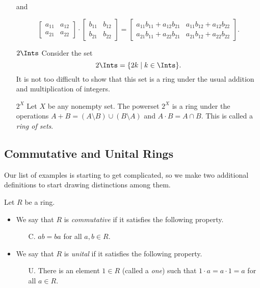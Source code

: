 \documentclass{article}
\begin{document}
\begin{itemize}
and

\[\begin{bmatrix} a_{11} & a_{12} \\ a_{21} & a_{22} \end{bmatrix} \cdot \begin{bmatrix} b_{11} & b_{12} \\ b_{21} & b_{22} \end{bmatrix} = \begin{bmatrix} a_{11}b_{11} + a_{12}b_{21} & a_{11}b_{12} + a_{12}b_{22} \\ a_{21}b_{11} + a_{22}b_{21} & a_{21}b_{12} + a_{22}b_{22} \end{bmatrix}.\]

\item[$2\Ints$] Consider the set \[ 2\Ints = \{ 2k \mid k \in \Ints \}. \] It is not too difficult to show that this set is a ring under the usual addition and multiplication of integers.

\item[$2^X$] Let $X$ be any nonempty set. The powerset $2^X$ is a ring under the operations $A + B = (A \setminus B) \cup (B \setminus A)$ and $A \cdot B = A \cap B$. This is called a \emph{ring of sets}.
\end{itemize}

\subsection*{Commutative and Unital Rings}

Our list of examples is starting to get complicated, so we make two additional definitions to start drawing distinctions among them.

\begin{dfn}
Let $R$ be a ring.
\begin{itemize}
\item We say that $R$ is \emph{commutative} if it satisfies the following property.
\begin{itemize}
\item[C.] $ab = ba$ for all $a,b \in R$.
\end{itemize}
\item We say that $R$ is \emph{unital} if it satisfies the following property.
\begin{itemize}
\item[U.] There is an element $1 \in R$ (called a \emph{one}) such that $1 \cdot a = a \cdot 1 = a$ for all $a \in R$.
\end{itemize}
\end{itemize}
\end{dfn}
\end{document}

